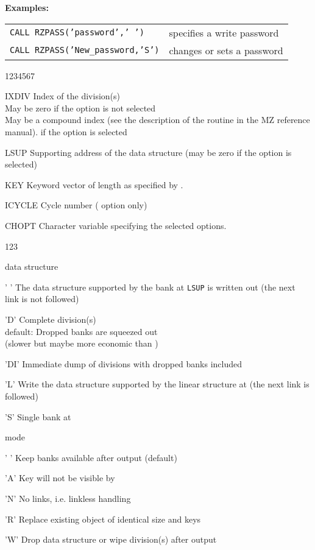 {\bf Examples:}\quad
\begin{tabular}[t]{>{\tt}l@{\qquad}l}
CALL RZPASS('password',' ')   & specifies a write password \\[2mm]
CALL RZPASS('New\_password,'S')& changes or sets a password
\end{tabular}


\Idesc
\begin{DLtt}{1234567}
  \item[IXDIV]Index of the division(s)\\
    May be zero if the  option is not selected\\
    May be a compound index
    (see the description of the routine  in the MZ reference
    manual).
    if the  option is selected
  \item[LSUP]Supporting address
    of the data structure (may be zero if the  option is selected)
  \item[KEY]Keyword vector of length  as specified by .
  \item[ICYCLE]Cycle number ( option only)
  \item[CHOPT]Character variable specifying the selected options.
  \begin{DLtt}{123}
    \item[{\rm data structure}] \mbox{ } 
    \begin{DLtt}{12}
      \item[' ']The data structure supported by the bank at
        {\tt LSUP} is written out (the next link is not followed)
      \item['D']Complete division(s)\\
        default: Dropped banks are squeezed out\\
        \phantom{default: }(slower but maybe more economic than )
      \item['DI']Immediate dump of divisions with dropped banks included
      \item['L']Write the data structure supported by the linear structure
        at  (the next link is followed)
      \item['S']Single bank at 
    \end{DLtt}
    \item[{\rm mode}] \mbox{ }
    \begin{DLtt}{12}
      \item[' ']Keep banks available after output (default)
      \item['A']Key will not be visible by 
      \item['N']No links, i.e. linkless handling
      \item['R']Replace existing object of identical size and keys
      \item['W']Drop data structure or wipe division(s) after output
    \end{DLtt}
  \end{DLtt}
\end{DLtt}
